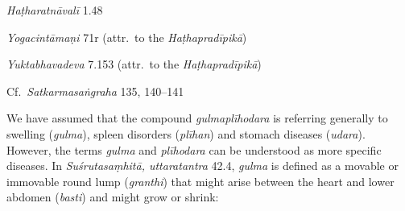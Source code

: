 \begin{ekdosis}

\begin{testimonia}[hp02_027]
\emph{Haṭharatnāvalī} 1.48

\begin{versinnote}
\end{versinnote}

\emph{Yogacintāmaṇi} 71r (attr.~to the \emph{Haṭhapradīpikā})

\begin{versinnote}
\end{versinnote}

\emph{Yuktabhavadeva} 7.153 (attr.~to the \emph{Haṭhapradīpikā})

\begin{versinnote}
\end{versinnote}

Cf.~\emph{Satkarmasaṅgraha} 135, 140–141

\begin{versinnote}
\end{versinnote}
\end{testimonia}

\begin{philcomm}[hp02_027]
We have assumed that the compound \emph{gulmaplīhodara} is referring generally to swelling (\emph{gulma}), spleen disorders (\emph{plīhan}) and stomach diseases (\emph{udara}). However, the terms \emph{gulma} and \emph{plīhodara} can be understood as more specific diseases. In \emph{Suśrutasaṃhitā, uttaratantra} 42.4, \emph{gulma} is defined as a movable or immovable round lump (\emph{granthi}) that might arise between the heart and lower abdomen (\emph{basti}) and might grow or shrink:


\end{philcomm}
\end{ekdosis}
